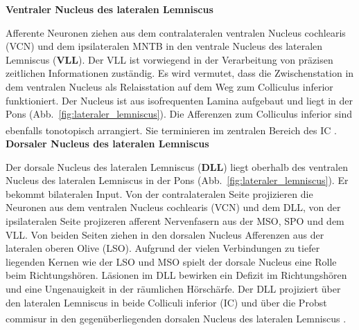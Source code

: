 \documentclass[12pt,a4paper,pdftex]{article}
\begin{document}
\textbf{Ventraler Nucleus des lateralen Lemniscus}

Afferente Neuronen ziehen aus dem contralateralen ventralen Nucleus cochlearis (VCN) und dem ipsilateralen MNTB in den ventrale Nucleus des lateralen Lemniscus (\textbf{VLL}). Der VLL ist vorwiegend in der Verarbeitung von präzisen zeitlichen Informationen zuständig.
Es wird vermutet, dass die Zwischenstation in dem ventralen Nucleus als Relaisstation auf dem Weg zum Colliculus inferior funktioniert.
Der Nucleus ist aus isofrequenten Lamina aufgebaut und liegt in der Pons (Abb.~\ref{fig:lateraler_lemniscus}). Die Afferenzen zum Colliculus inferior sind ebenfalls tonotopisch arrangiert. Sie terminieren im zentralen Bereich des IC \textsuperscript{\cite[29]{paxinos2014rat}}.
\\

\textbf{Dorsaler Nucleus des lateralen Lemniscus}

Der dorsale Nucleus des lateralen Lemniscus (\textbf{DLL}) liegt oberhalb des ventralen Nucleus des lateralen Lemniscus in der Pons (Abb.~\ref{fig:lateraler_lemniscus}). Er bekommt bilateralen Input. Von der contralateralen Seite projizieren die Neuronen aus dem ventralen Nucleus cochlearis (VCN) und dem DLL, von der ipsilateralen Seite projizeren afferent Nervenfasern aus der MSO, SPO und dem VLL. Von beiden Seiten ziehen in den dorsalen Nucleus Afferenzen aus der lateralen oberen Olive (LSO).
Aufgrund der vielen Verbindungen zu tiefer liegenden Kernen wie der LSO und MSO spielt der dorsale Nucleus eine Rolle beim Richtungshören. Läsionen im DLL bewirken ein Defizit im Richtungshören und eine Ungenauigkeit in der räumlichen Hörschärfe. 
Der DLL projiziert über den lateralen Lemniscus in beide Colliculi inferior (IC) und über die Probst commisur in den gegenüberliegenden dorsalen Nucleus des lateralen Lemniscus
\textsuperscript{\cite[29]{paxinos2014rat}}.
\end{document}
